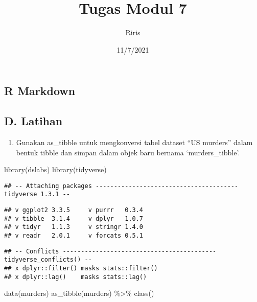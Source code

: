 \documentclass[
]{article}
\title{Tugas Modul 7}
\author{Riris}
\date{11/7/2021}
\newenvironment{Shaded}{\begin{snugshade}}{\end{snugshade}}
\newcommand{\FunctionTok}[1]{\textcolor[rgb]{0.00,0.00,0.00}{#1}}
\newcommand{\NormalTok}[1]{#1}
\newcommand{\SpecialCharTok}[1]{\textcolor[rgb]{0.00,0.00,0.00}{#1}}
\providecommand{\tightlist}{%
  \setlength{\itemsep}{0pt}\setlength{\parskip}{0pt}}
\begin{document}
\maketitle

\hypertarget{r-markdown}{%
\subsection{R Markdown}\label{r-markdown}}

\hypertarget{d.-latihan}{%
\subsection{D. Latihan}\label{d.-latihan}}

\begin{enumerate}
\def\labelenumi{\arabic{enumi}.}
\tightlist
\item
  Gunakan as\_tibble untuk mengkonversi tabel dataset ``US murders''
  dalam bentuk tibble dan simpan dalam objek baru bernama
  `murders\_tibble'.
\end{enumerate}

\begin{Shaded}
\begin{Highlighting}[]
\FunctionTok{library}\NormalTok{(dslabs)}
\FunctionTok{library}\NormalTok{(tidyverse)}
\end{Highlighting}
\end{Shaded}

\begin{verbatim}
## -- Attaching packages --------------------------------------- tidyverse 1.3.1 --
\end{verbatim}

\begin{verbatim}
## v ggplot2 3.3.5     v purrr   0.3.4
## v tibble  3.1.4     v dplyr   1.0.7
## v tidyr   1.1.3     v stringr 1.4.0
## v readr   2.0.1     v forcats 0.5.1
\end{verbatim}

\begin{verbatim}
## -- Conflicts ------------------------------------------ tidyverse_conflicts() --
## x dplyr::filter() masks stats::filter()
## x dplyr::lag()    masks stats::lag()
\end{verbatim}

\begin{Shaded}
\begin{Highlighting}[]
\FunctionTok{data}\NormalTok{(murders)}
\FunctionTok{as\_tibble}\NormalTok{(murders) }\SpecialCharTok{\%\textgreater{}\%} \FunctionTok{class}\NormalTok{()}
\end{Highlighting}
\end{Shaded}
\end{document}
